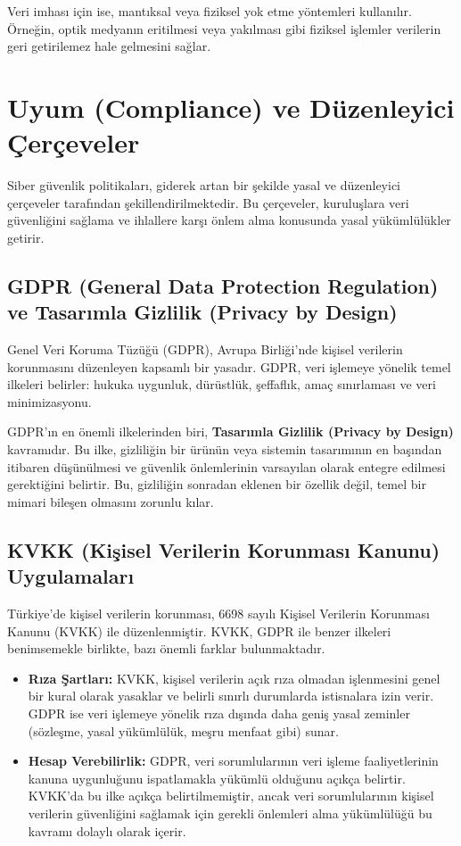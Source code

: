 Veri imhası için ise, mantıksal veya fiziksel yok etme yöntemleri kullanılır. Örneğin, optik medyanın eritilmesi veya yakılması gibi fiziksel işlemler verilerin geri getirilemez hale gelmesini sağlar.

\section{Uyum (Compliance) ve Düzenleyici Çerçeveler}

Siber güvenlik politikaları, giderek artan bir şekilde yasal ve düzenleyici çerçeveler tarafından şekillendirilmektedir. Bu çerçeveler, kuruluşlara veri güvenliğini sağlama ve ihlallere karşı önlem alma konusunda yasal yükümlülükler getirir.

\subsection{GDPR (General Data Protection Regulation) ve Tasarımla Gizlilik (Privacy by Design)}

Genel Veri Koruma Tüzüğü (GDPR), Avrupa Birliği'nde kişisel verilerin korunmasını düzenleyen kapsamlı bir yasadır. GDPR, veri işlemeye yönelik temel ilkeleri belirler: hukuka uygunluk, dürüstlük, şeffaflık, amaç sınırlaması ve veri minimizasyonu.

GDPR'ın en önemli ilkelerinden biri, \textbf{Tasarımla Gizlilik (Privacy by Design)} kavramıdır. Bu ilke, gizliliğin bir ürünün veya sistemin tasarımının en başından itibaren düşünülmesi ve güvenlik önlemlerinin varsayılan olarak entegre edilmesi gerektiğini belirtir. Bu, gizliliğin sonradan eklenen bir özellik değil, temel bir mimari bileşen olmasını zorunlu kılar.

\subsection{KVKK (Kişisel Verilerin Korunması Kanunu) Uygulamaları}

Türkiye'de kişisel verilerin korunması, 6698 sayılı Kişisel Verilerin Korunması Kanunu (KVKK) ile düzenlenmiştir. KVKK, GDPR ile benzer ilkeleri benimsemekle birlikte, bazı önemli farklar bulunmaktadır.

\begin{itemize}
    \item \textbf{Rıza Şartları:} KVKK, kişisel verilerin açık rıza olmadan işlenmesini genel bir kural olarak yasaklar ve belirli sınırlı durumlarda istisnalara izin verir. GDPR ise veri işlemeye yönelik rıza dışında daha geniş yasal zeminler (sözleşme, yasal yükümlülük, meşru menfaat gibi) sunar.
    \item \textbf{Hesap Verebilirlik:} GDPR, veri sorumlularının veri işleme faaliyetlerinin kanuna uygunluğunu ispatlamakla yükümlü olduğunu açıkça belirtir. KVKK'da bu ilke açıkça belirtilmemiştir, ancak veri sorumlularının kişisel verilerin güvenliğini sağlamak için gerekli önlemleri alma yükümlülüğü bu kavramı dolaylı olarak içerir.
\end{itemize}

